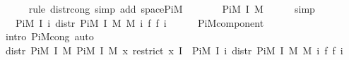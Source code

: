 \begin{isabellebody}
\ \ \ \ \isamarkupfalse%
\ {\isacharparenleft}{\kern0pt}rule\ distr{\isacharunderscore}{\kern0pt}cong{\isacharsemicolon}{\kern0pt}\ simp\ add{\isacharcolon}{\kern0pt}\ space{\isacharunderscore}{\kern0pt}PiM{\isacharparenright}{\kern0pt}\isanewline
\ \ \isamarkupfalse%
\ \isamarkupfalse%
\ {\isachardoublequoteopen}{\isachardot}{\kern0pt}{\isachardot}{\kern0pt}{\isachardot}{\kern0pt}\ {\isacharequal}{\kern0pt}\ PiM\ I\ M{\isachardoublequoteclose}\isanewline
\ \ \ \ \isamarkupfalse%
\ simp\isanewline
\ \ \isamarkupfalse%
\ \isamarkupfalse%
\ {\isachardoublequoteopen}{\isachardot}{\kern0pt}{\isachardot}{\kern0pt}{\isachardot}{\kern0pt}\ {\isacharequal}{\kern0pt}\ Pi\isactrlsub M\ I\ {\isacharparenleft}{\kern0pt}{\isasymlambda}i{\isachardot}{\kern0pt}\ distr\ {\isacharparenleft}{\kern0pt}Pi\isactrlsub M\ I\ M{\isacharparenright}{\kern0pt}\ {\isacharparenleft}{\kern0pt}M\ i{\isacharparenright}{\kern0pt}\ {\isacharparenleft}{\kern0pt}{\isasymlambda}f{\isachardot}{\kern0pt}\ f\ i{\isacharparenright}{\kern0pt}{\isacharparenright}{\kern0pt}{\isachardoublequoteclose}\isanewline
\ \ \ \ \isamarkupfalse%
\ PiM{\isacharunderscore}{\kern0pt}component\ \isamarkupfalse%
\ {\isacharparenleft}{\kern0pt}intro\ PiM{\isacharunderscore}{\kern0pt}cong{\isacharcomma}{\kern0pt}\ auto{\isacharparenright}{\kern0pt}\isanewline
\ \ \isamarkupfalse%
\ \isamarkupfalse%
\ {\isachardoublequoteopen}distr\ {\isacharparenleft}{\kern0pt}Pi\isactrlsub M\ I\ M{\isacharparenright}{\kern0pt}\ {\isacharparenleft}{\kern0pt}Pi\isactrlsub M\ I\ M{\isacharparenright}{\kern0pt}\ {\isacharparenleft}{\kern0pt}{\isasymlambda}x{\isachardot}{\kern0pt}\ restrict\ x\ I{\isacharparenright}{\kern0pt}\ {\isacharequal}{\kern0pt}\ Pi\isactrlsub M\ I\ {\isacharparenleft}{\kern0pt}{\isasymlambda}i{\isachardot}{\kern0pt}\ distr\ {\isacharparenleft}{\kern0pt}Pi\isactrlsub M\ I\ M{\isacharparenright}{\kern0pt}\ {\isacharparenleft}{\kern0pt}M\ i{\isacharparenright}{\kern0pt}\ {\isacharparenleft}{\kern0pt}{\isasymlambda}f{\isachardot}{\kern0pt}\ f\ i{\isacharparenright}{\kern0pt}{\isacharparenright}{\kern0pt}{\isachardoublequoteclose}\isanewline
\ \ \ \ \isacommand{{\isachardot}{\kern0pt}}\isamarkupfalse%
\isanewline
{}\isamarkupfalse%
%
\endisatagproof
{\isafoldproof}%
%
\isadelimproof
\isanewline
%
\endisadelimproof
%
\isadelimtheory
\isanewline
%
\endisadelimtheory
%
\isatagtheory
{}\isamarkupfalse%
%
\endisatagtheory
{\isafoldtheory}%
%
\isadelimtheory
%
\endisadelimtheory
%
\end{isabellebody}%
